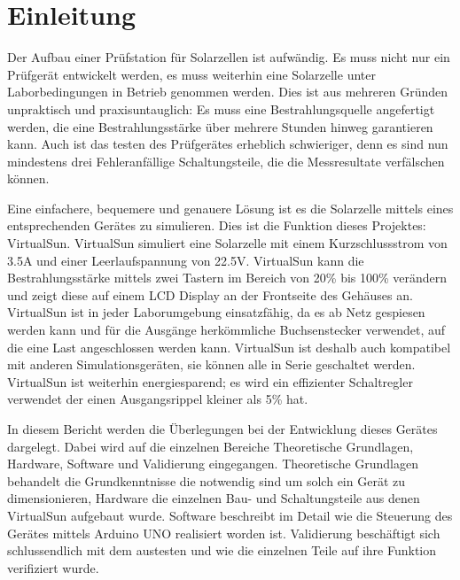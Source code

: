 \documentclass[a4paper]{fhnwreport} %
\begin{document}
\section{Einleitung}

Der Aufbau einer Prüfstation für Solarzellen ist aufwändig. Es muss nicht nur ein Prüfgerät entwickelt werden, es muss weiterhin eine Solarzelle unter Laborbedingungen in Betrieb genommen werden. Dies ist aus mehreren Gründen unpraktisch und praxisuntauglich: Es muss eine Bestrahlungsquelle angefertigt werden, die eine Bestrahlungsstärke über mehrere Stunden hinweg garantieren kann. Auch ist das testen des Prüfgerätes erheblich schwieriger, denn es sind nun mindestens drei Fehleranfällige Schaltungsteile, die die Messresultate verfälschen können. 

Eine einfachere, bequemere und genauere Lösung ist es die Solarzelle mittels eines entsprechenden Gerätes zu simulieren. Dies ist die Funktion dieses Projektes: VirtualSun.
VirtualSun simuliert eine Solarzelle mit einem Kurzschlussstrom von 3.5A und einer Leerlaufspannung von 22.5V. VirtualSun kann die Bestrahlungsstärke mittels zwei Tastern im Bereich von 20\% bis 100\% verändern und zeigt diese auf einem LCD Display an der Frontseite des Gehäuses an. VirtualSun ist in jeder Laborumgebung einsatzfähig, da es ab Netz gespiesen werden kann und für die Ausgänge herkömmliche Buchsenstecker verwendet, auf die eine Last angeschlossen werden kann. VirtualSun ist deshalb auch kompatibel mit anderen Simulationsgeräten, sie können alle in Serie geschaltet werden. VirtualSun ist weiterhin energiesparend; es wird ein effizienter Schaltregler verwendet der einen Ausgangsrippel kleiner als 5\% hat. 

In diesem Bericht werden die Überlegungen bei der Entwicklung dieses Gerätes dargelegt. Dabei wird auf die einzelnen Bereiche Theoretische Grundlagen, Hardware, Software und Validierung eingegangen. Theoretische Grundlagen behandelt die Grundkenntnisse die notwendig sind um solch ein Gerät zu dimensionieren, Hardware die einzelnen Bau- und Schaltungsteile aus denen VirtualSun aufgebaut wurde. Software beschreibt im Detail wie die Steuerung des Gerätes mittels Arduino UNO realisiert worden ist. Validierung beschäftigt sich schlussendlich mit dem austesten und wie die einzelnen Teile auf ihre Funktion verifiziert wurde.
\newpage
%
%
\end{document}
